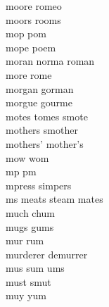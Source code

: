 moore romeo\\
moors rooms\\
mop pom\\
mope poem\\
moran norma roman\\
more rome\\
morgan gorman\\
morgue gourme\\
motes tomes smote\\
mothers smother\\
mothers' mother's\\
mow wom\\
mp pm\\
mpress simpers \\
ms meats steam mates   \\
much chum\\
mugs gums\\
mur rum\\
murderer demurrer\\
mus sum ums\\
must smut\\
muy yum\\

